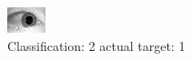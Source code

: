 \begin{figure}[h!]
\begin{center}
\includegraphics[width=0.60\columnwidth]{figures/ID1445_class_2_target_1.png}
\end{center}
\caption{ Classification: 2 actual target: 1}
\label{fig:ID1445_class_2_target_1}
\end{figure}
